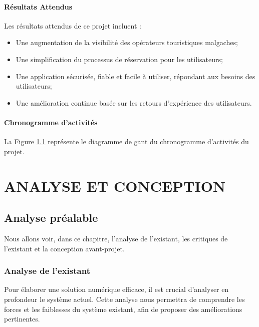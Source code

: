 \documentclass[12pt]{report}
\begin{document}
				\subsection{Résultats Attendus}

				\hspace{15pt} Les résultats attendus de ce projet incluent :
				
				\begin{itemize}
					\item Une augmentation de la visibilité des opérateurs touristiques malgaches;
					\item Une simplification du processus de réservation pour les utilisateurs;
					\item Une application sécurisée, fiable et facile à utiliser, répondant aux besoins des utilisateurs;
					\item Une amélioration continue basée sur les retours d'expérience des utilisateurs.
				\end{itemize}

				\subsection{Chronogramme d'activités}

				\hspace{15pt} La Figure \ref{} représente le diagramme de gant du chronogramme d'activités du projet.

				\part{ANALYSE ET CONCEPTION}
				\chapter{Analyse préalable}
				
				\hspace{15pt} Nous allons voir, dans ce chapitre, l’analyse de l’existant, les critiques de l’existant et la conception avant-projet.

				\section{Analyse de l'existant}
				
				\hspace{15pt} Pour élaborer une solution numérique efficace, il est crucial d'analyser en profondeur le système actuel. Cette analyse nous permettra de comprendre les forces et les faiblesses du système existant, afin de proposer des améliorations pertinentes.
\end{document}
